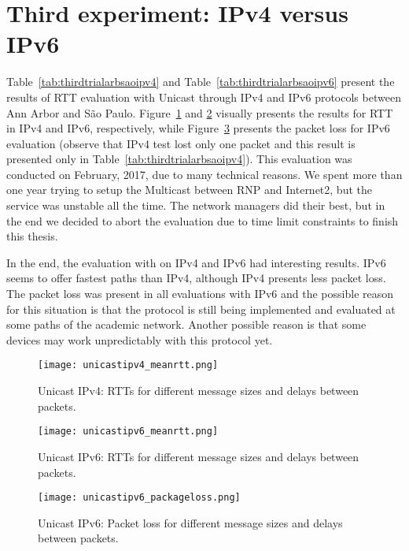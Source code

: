 \section{Third experiment: IPv4 versus IPv6}
\label{sec:thirdtrial}

Table~\ref{tab:thirdtrialarbsaoipv4} and Table~\ref{tab:thirdtrialarbsaoipv6} present the results of RTT evaluation with Unicast through IPv4 and IPv6 protocols between Ann Arbor and São Paulo.
Figure~\ref{fig:third-ipv4-rtt} and \ref{fig:third-ipv6-rtt} visually presents the results for RTT in IPv4 and IPv6, respectively, while Figure~\ref{fig:third-ipv6-packetloss} presents the packet loss for IPv6 evaluation (observe that IPv4 test lost only one packet and this result is presented only in Table~\ref{tab:thirdtrialarbsaoipv4}).
This evaluation was conducted on February, 2017, due to many technical reasons.
We spent more than one year trying to setup the Multicast between RNP and Internet2, but the service was unstable all the time.
The network managers did their best, but in the end we decided to abort the evaluation due to time limit constraints to finish this thesis.

In the end, the evaluation with on IPv4 and IPv6 had interesting results.
IPv6 seems to offer fastest paths than IPv4, although IPv4 presents less packet loss.
The packet loss was present in all evaluations with IPv6 and the possible reason for this situation is that the protocol is still being implemented and evaluated at some paths of the academic network.
Another possible reason is that some devices may work unpredictably with this protocol yet.

\begin{figure}[!ht]
	\centering
	\texttt{[image: unicastipv4\_meanrtt.png]}
	\caption{Unicast IPv4: RTTs for different message sizes and delays between packets.}
	\label{fig:third-ipv4-rtt}
\end{figure}

\begin{figure}[!ht]
	\centering
	\texttt{[image: unicastipv6\_meanrtt.png]}
	\caption{Unicast IPv6: RTTs for different message sizes and delays between packets.}
	\label{fig:third-ipv6-rtt}
\end{figure}

\begin{figure}[!ht]
	\centering
	\texttt{[image: unicastipv6\_packageloss.png]}
	\caption{Unicast IPv6: Packet loss for different message sizes and delays between packets.}
	\label{fig:third-ipv6-packetloss}
\end{figure}

